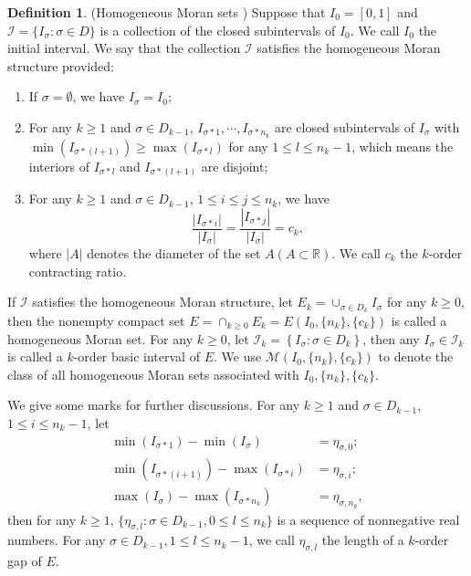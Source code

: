 \documentclass[reqno]{amsart}
\theoremstyle{plain}
\theoremstyle{definition}
\newtheorem{defn}{Definition}
\theoremstyle{remark}
\numberwithin{equation}{section} \DeclareMathOperator\intr{int}
\begin{document}
\begin{defn}\label{HMS}(Homogeneous Moran sets \rm{\cite{hua00}})
Suppose that $I_0=[0,1]$ and $\mathcal I=\{I_\sigma:\sigma\in D \}$ is a collection of the closed subintervals of $I_0$. We call $I_0$ the initial interval. We say that the collection $\mathcal I$ satisfies the homogeneous Moran structure provided:
\begin{enumerate}
\item[\textup{(1)}] If $\sigma=\emptyset$, we have $I_{\sigma}=I_{0}$;
\item[\textup{(2)}] For any $k\ge1$ and $\sigma\in{D_{k-1}}$, $I_{\sigma * 1}, \cdots, I_{\sigma * n_{k}}$ are closed subintervals of $I_{\sigma}$  with $\min(I_{\sigma*(l+1)})\ge \max(I_{\sigma*l})$ for any $1\le l \le n_{k}-1$, which means the interiors of $I_{\sigma*l}$ and $I_{\sigma*(l+1)}$ are disjoint;
\item[\textup{(3)}] For any $k\ge1$ and $\sigma\in{D_{k-1}}$, $1\le i \le j \le n_{k}$, we have $$\frac{\left|I_{\sigma * i}\right|}{\left|I_{\sigma}\right|}=\frac{\left|I_{\sigma * j}\right|}{\left|I_{\sigma}\right|}=c_{k},$$
where $\left|A\right|$ denotes the diameter of the set $A(A\subset \mathbb{R})$. We call $c_k$ the $k$-order contracting ratio.
\end{enumerate}

If $\mathcal{I}$ satisfies the homogeneous Moran structure, let $E_{k}=\cup_{\sigma\in{D_{k}}}I_{\sigma}$ for any $k\ge0$,  then the  nonempty compact set
	$E=\cap_{k\ge0}E_{k}=E(I_{0},\{n_{k}\},\{c_{k}\})$ is called a homogeneous Moran set.
	For any $k\ge0$, let $\mathcal{I}_{k}=\left\{I_{\sigma}:\sigma\in{D_{k}}\right\}$, then any $I_{\sigma}\in \mathcal{I}_{k}$ is called a $k$-order basic interval of $E$. We use $\mathcal{M}(I_{0},\{n_{k}\},\{c_{k}\})$ to denote the class of all homogeneous Moran sets associated with $I_{0},\{n_{k}\},\{c_{k}\}$.


\end{defn}

\bigskip
We give some marks for further discussions. For any $k\ge 1$ and $\sigma \in D_{k-1}$,
$1\le i \le n_k-1$, let
\begin{equation}
 \begin{aligned}
     \min(I_{\sigma*1})-\min(I_{\sigma})&=\eta_{\sigma,0};\\
     \min(I_{\sigma*(i+1)})-\max(I_{\sigma*i})&=\eta_{\sigma,i};\\
     \max(I_{\sigma})-\max(I_{\sigma*n_k})&=\eta_{\sigma,n_k},\nonumber
 \end{aligned}
 \end{equation}
then for any $k\ge 1$, $\{\eta_{\sigma,l}:\sigma \in D_{k-1}, 0\le l \le n_k\}$ is a sequence of nonnegative real numbers. For any  $\sigma \in D_{k-1}, 1\le l \le n_k-1$, we call $\eta_{\sigma,l}$ the length of a $k$-order gap of $E$.
\end{document}
